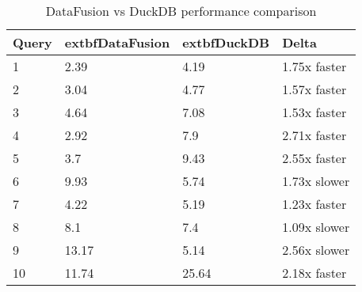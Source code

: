 \begin{table}[h]
\centering
\begin{tabular}{|l|l|l|l|}
\hline
Query & 	extbf{DataFusion} & 	extbf{DuckDB} & Delta \\
\hline
1 & 2.39 & 4.19 & 1.75x faster \\
\hline
2 & 3.04 & 4.77 & 1.57x faster \\
\hline
3 & 4.64 & 7.08 & 1.53x faster \\
\hline
4 & 2.92 & 7.9 & 2.71x faster \\
\hline
5 & 3.7 & 9.43 & 2.55x faster \\
\hline
6 & 9.93 & 5.74 & 1.73x slower \\
\hline
7 & 4.22 & 5.19 & 1.23x faster \\
\hline
8 & 8.1 & 7.4 & 1.09x slower \\
\hline
9 & 13.17 & 5.14 & 2.56x slower \\
\hline
10 & 11.74 & 25.64 & 2.18x faster \\
\hline
\end{tabular}
\caption{DataFusion vs DuckDB performance comparison}
\label{table:1}
\end{table}